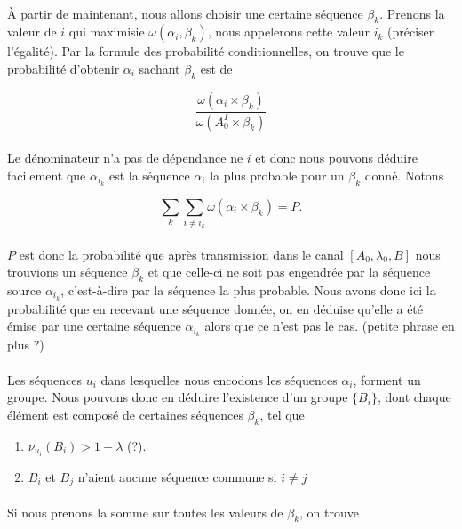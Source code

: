 	\paragraph{}
	À partir de maintenant, nous allons choisir une certaine séquence $\beta_k$.
	Prenons la valeur de $i$ qui maximisie $\omega(\alpha_i,\beta_k)$, nous appelerons cette valeur $i_k$ (préciser l'égalité).
	Par la formule des probabilité conditionnelles, on trouve que le probabilité d'obtenir $\alpha_i$ sachant $\beta_k$ est de 
	
	\[\frac{\omega(\alpha_i \times \beta_k)}{\omega(A_0^I \times \beta_k)}\]
	
	\paragraph{}
	Le dénominateur n'a pas de dépendance ne $i$ et donc nous pouvons déduire facilement que $\alpha_{i_k}$ est la séquence $\alpha_i$ la plus probable pour un $\beta_k$ donné.
	Notons
	
	\[\sum_k\sum_{i\neq i_k}\omega(\alpha_i \times \beta_k) = P.\]
	
	\paragraph{}
	$P$ est donc la probabilité que après transmission dans le canal $[A_0,\lambda_0,B]$ nous trouvions un séquence $\beta_k$ et que celle-ci ne soit pas engendrée par 
	la séquence source $\alpha_{i_k}$, c'est-à-dire par la séquence la plus probable. Nous avons donc ici la probabilité que en recevant une séquence donnée, on en déduise
	qu'elle a été émise par une certaine séquence $\alpha_{i_k}$ alors que ce n'est pas le cas. (petite phrase en plus ?)
	
	\paragraph{}
	Les séquences $u_i$ dans lesquelles nous encodons les séquences $\alpha_i$, forment un groupe. Nous pouvons donc en déduire l'existence d'un groupe $\{B_i\}$, dont 
	chaque élément est composé de certaines séquences $\beta_k$, tel que 
	\begin{enumerate}
		\item $\nu_{u_i}(B_i) > 1-\lambda$ (?).
		\item $B_i$ et $B_j$ n'aient aucune séquence commune si $i\neq j$
	\end{enumerate}
	
	\paragraph{}Si nous prenons la somme sur toutes les valeurs de $\beta_k$, on trouve
	
